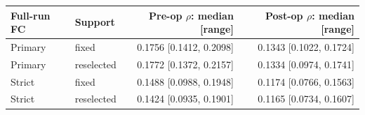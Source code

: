 \begin{tabular}{llrr}
\toprule
Full-run FC & Support & Pre-op $\rho$: median [range] & Post-op $\rho$: median [range] \\
\midrule
Primary & fixed & 0.1756 [0.1412, 0.2098] & 0.1343 [0.1022, 0.1724] \\
Primary & reselected & 0.1772 [0.1372, 0.2157] & 0.1334 [0.0974, 0.1741] \\
Strict & fixed & 0.1488 [0.0988, 0.1948] & 0.1174 [0.0766, 0.1563] \\
Strict & reselected & 0.1424 [0.0935, 0.1901] & 0.1165 [0.0734, 0.1607] \\
\bottomrule
\end{tabular}

